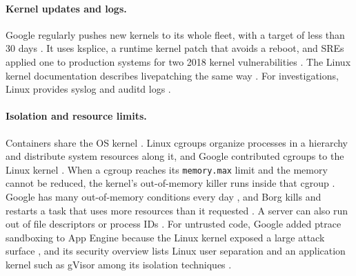 \paragraph{Kernel updates and logs.}
Google regularly pushes new kernels to its whole fleet, with a target of less than 30 days \cite{bsrs}. It uses ksplice, a runtime kernel patch that avoids a reboot, and SREs applied one to production systems for two 2018 kernel vulnerabilities \cite{bsrs}. The Linux kernel documentation describes livepatching the same way \cite{kernel-docs}. For investigations, Linux provides syslog and auditd logs \cite{bsrs}.

\paragraph{Isolation and resource limits.}
Containers share the OS kernel \cite{cloud-google-learn-what-are-containers}. Linux cgroups organize processes in a hierarchy and distribute system resources along it, and Google contributed cgroups to the Linux kernel \cite{kernel-docs,cloud-google-learn-what-are-containers}. When a cgroup reaches its \texttt{memory.max} limit and the memory cannot be reduced, the kernel's out-of-memory killer runs inside that cgroup \cite{kernel-docs}. Google has many out-of-memory conditions every day \cite{bsrs}, and Borg kills and restarts a task that uses more resources than it requested \cite{sre-book}. A server can also run out of file descriptors or process IDs \cite{sre-book}. For untrusted code, Google added ptrace sandboxing to App Engine because the Linux kernel exposed a large attack surface \cite{bsrs}, and its security overview lists Linux user separation and an application kernel such as gVisor among its isolation techniques \cite{docs-cloud-google-docs-security-infrastructure-design}.
